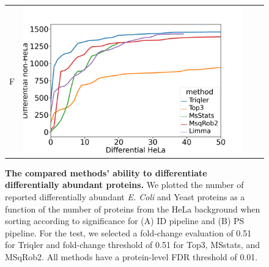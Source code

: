 \documentclass[11pt]{article}
\begin{document}
\begin{figure}[hbt]
\begin{tabular}{lclc}
        F & \includegraphics[width=0.4\linewidth]{../../result/report_plots_pipeline/diff_HeLa_vs_nonHeLa_PS_all_0.51_Limma.png} \\ 

    \end{tabular}
    \caption{{\bf The compared methods' ability to differentiate differentially abundant proteins.} We plotted the number of reported differentially abundant  {\em E. Coli} and Yeast proteins as a function of the number of proteins from the HeLa background when sorting according to significance for (A) ID pipeline and (B) PS pipeline. For the test, we selected a fold-change evaluation of 0.51 for Triqler and fold-change threshold of 0.51 for Top3, MSstats, and MSqRob2. All methods have a protein-level FDR threshold of 0.01. \label{fig:ability_to_differentiate_differentially_abundant_specie_vs_hela}}
\end{figure}
\end{document}
